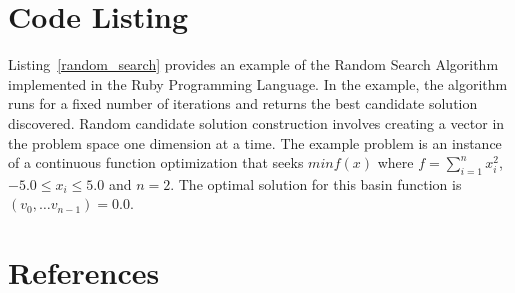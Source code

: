 \documentclass[a4paper, 11pt]{article}
\begin{document}
\section{Code Listing}
\label{sec:code}
Listing~\ref{random_search} provides an example of the Random Search Algorithm implemented in the Ruby Programming Language. 
In the example, the algorithm runs for a fixed number of iterations and returns the best candidate solution discovered. Random candidate solution construction involves creating a vector in the problem space one dimension at a time.
The example problem is an instance of a continuous function optimization that seeks $min f(x)$ where $f=\sum_{i=1}^n x_{i}^2$, $-5.0\leq x_i \leq 5.0$ and $n=2$. The optimal solution for this basin function is $(v_0,\ldots v_{n-1})=0.0$.



\section{References}
\label{sec:references}
\end{document}
